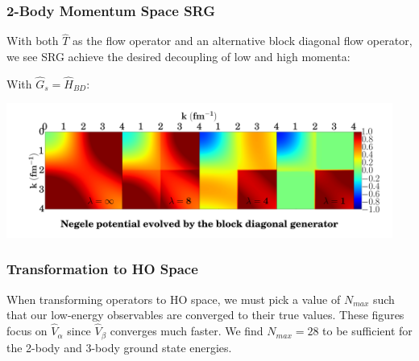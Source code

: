 \documentclass{beamer}
\begin{document}
{\begin{frame}
\end{frame}

\begin{frame}
\frametitle{2-Body Momentum Space SRG}
With both $\hat{T}$ as the flow operator and an alternative block diagonal flow operator, we see SRG achieve the desired decoupling of low and high momenta:

\vspace{\baselineskip}
With $\hat{G}_s = \hat{H}_{BD}$:
\begin{center}
\includegraphics[trim={0 5cm 0 0},clip,width=0.95\textwidth]{BD_1_evolution}
\end{center}

\end{frame}

\begin{frame}
\frametitle{Transformation to HO Space}
When transforming operators to HO space, we must pick a value of $N_{max}$ such that our low-energy observables are converged to their true values. These figures focus on $\hat{V}_\alpha$ since $\hat{V}_\beta$ converges much faster. We find $N_{max}=28$ to be sufficient for the 2-body and 3-body ground state energies.

\begin{figure}
\begin{center}
\end{center}
\end{figure}


\end{frame}}
\end{document}
